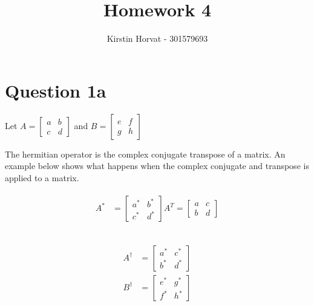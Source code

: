 \documentclass{article}
\title{Homework 4}
\author{Kirstin Horvat - 301579693}
\begin{document}
\maketitle

\section*{Question 1a}
Let \(A = \begin{bmatrix} a & b \\ c & d \end{bmatrix}\) and \(B = \begin{bmatrix} e & f \\ g & h \end{bmatrix}\) \\
\begin{paragraph}
The hermitian operator is the complex conjugate transpose of a matrix. An example below shows what happens when the complex conjugate and transpose is applied to a matrix.
\end{paragraph}

\begin{align*}
\begin{split}
    A^* &= \begin{bmatrix} a^* & b^* \\ c^* & d^* \end{bmatrix} A^T = \begin{bmatrix} a & c \\ b & d \end{bmatrix} \\\\
\end{split}
\end{align*}

\begin{align*}
    \begin{split}
        A^{\dagger} &= \begin{bmatrix} a^* & c^* \\ b^* & d^* \end{bmatrix} \\ 
        B^{\dagger} &= \begin{bmatrix} e^* & g^* \\ f^* & h^* \end{bmatrix} \\\\
    \end{split}
\end{align*}
\end{document}
